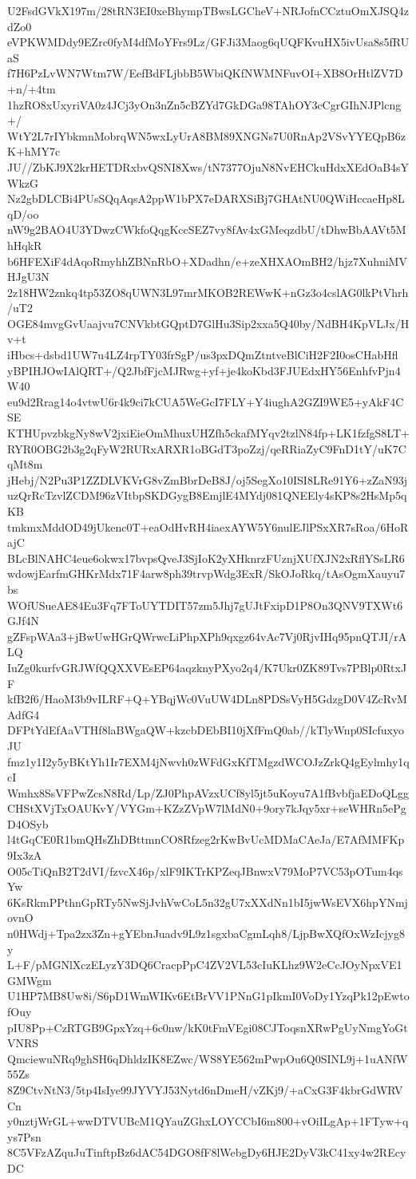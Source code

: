 U2FsdGVkX197m/28tRN3EI0xeBhympTBwsLGCheV+NRJofnCCztuOmXJSQ4zdZo0
eVPKWMDdy9EZrc0fyM4dfMoYFrs9Lz/GFJi3Maog6qUQFKvuHX5ivUsa8s5fRUaS
f7H6PzLvWN7Wtm7W/EefBdFLjbbB5WbiQKfNWMNFuvOI+XB8OrHtlZV7D+n/+4tm
1hzRO8xUxyriVA0z4JCj3yOn3nZn5cBZYd7GkDGa98TAhOY3cCgrGIhNJPlcng+/
WtY2L7rIYbkmnMobrqWN5wxLyUrA8BM89XNGNs7U0RnAp2VSvYYEQpB6zK+hMY7c
JU//ZbKJ9X2krHETDRxbvQSNI8Xws/tN7377OjuN8NvEHCkuHdxXEdOaB4sYWkzG
Nz2gbDLCBi4PUsSQqAqsA2ppW1bPX7eDARXSiBj7GHAtNU0QWiHccaeHp8LqD/oo
nW9g2BAO4U3YDwzCWkfoQqgKccSEZ7vy8fAv4xGMeqzdbU/tDhwBbAAVt5MhHqkR
b6HFEXiF4dAqoRmyhhZBNnRbO+XDadhn/e+zeXHXAOmBH2/hjz7XuhniMVHJgU3N
2z18HW2znkq4tp53ZO8qUWN3L97mrMKOB2REWwK+nGz3o4cslAG0lkPtVhrh/uT2
OGE84mvgGvUaajvu7CNVkbtGQptD7GlHu3Sip2xxa5Q40by/NdBH4KpVLJx/Hv+t
iHbcs+dsbd1UW7u4LZ4rpTY03frSgP/us3pxDQmZtntveBlCiH2F2I0osCHabHfl
yBPIHJOwIAlQRT+/Q2JbfFjcMJRwg+yf+je4koKbd3FJUEdxHY56EnhfvPjn4W40
eu9d2Rrag14o4vtwU6r4k9ci7kCUA5WeGcI7FLY+Y4iughA2GZI9WE5+yAkF4CSE
KTHUpvzbkgNy8wV2jxiEieOmMhuxUHZfh5ckafMYqv2tzlN84fp+LK1fzfgS8LT+
RYR0OBG2b3g2qFyW2RURxARXR1oBGdT3poZzj/qeRRiaZyC9FnD1tY/uK7CqMt8m
jHebj/N2Pu3P1ZZDLVKVrG8vZmBbrDeB8J/oj5SegXo10ISI8LRe91Y6+zZaN93j
uzQrRcTzvlZCDM96zVItbpSKDGygB8EmjlE4MYdj081QNEEly4sKP8s2HsMp5qKB
tmkmxMddOD49jUkenc0T+eaOdHvRH4iaexAYW5Y6nulEJlPSxXR7sRoa/6HoRajC
BLcBlNAHC4eue6okwx17bvpsQveJ3SjIoK2yXHknrzFUznjXUfXJN2xRflYSsLR6
wdowjEarfmGHKrMdx71F4arw8ph39trvpWdg3ExR/SkOJoRkq/tAsOgmXauyu7bs
WOfUSueAE84Eu3Fq7FToUYTDIT57zm5Jhj7gUJtFxipD1P8On3QNV9TXWt6GJf4N
gZFspWAa3+jBwUwHGrQWrwcLiPhpXPh9qxgz64vAc7Vj0RjvIHq95pnQTJI/rALQ
IuZg0kurfvGRJWfQQXXVEsEP64aqzknyPXyo2q4/K7Ukr0ZK89Tvs7PBlp0RtxJF
kfB2f6/HaoM3b9vILRF+Q+YBqjWc0VuUW4DLn8PDSsVyH5GdzgD0V4ZcRvMAdfG4
DFPtYdEfAaVTHf8laBWgaQW+kzcbDEbBI10jXfFmQ0ab//kTlyWnp0SIcfuxyoJU
fmz1y1I2y5yBKtYh1Ir7EXM4jNwvh0zWFdGxKfTMgzdWCOJzZrkQ4gEylmhy1qcI
Wmhx8SsVFPwZcsN8Rd/Lp/ZJ0PhpAVzxUCf8yl5jt5uKoyu7A1fBvbfjaEDoQLgg
CHStXVjTxOAUKvY/VYGm+KZzZVpW7lMdN0+9ory7kJqy5xr+seWHRn5ePgD4OSyb
l4tGqCE0R1bmQHsZhDBttmnCO8Rfzeg2rKwBvUcMDMaCAeJa/E7AfMMFKp9Ix3zA
O05cTiQnB2T2dVI/fzvcX46p/xlF9IKTrKPZeqJBnwxV79MoP7VC53pOTum4qsYw
6KsRkmPPthnGpRTy5NwSjJvhVwCoL5n32gU7xXXdNn1bI5jwWsEVX6hpYNmjovnO
n0HWdj+Tpa2zx3Zn+gYEbnJuadv9L9z1sgxbaCgmLqh8/LjpBwXQfOxWzIcjyg8y
L+F/pMGNlXczELyzY3DQ6CracpPpC4ZV2VL53cIuKLhz9W2eCcJOyNpxVE1GMWgm
U1HP7MB8Uw8i/S6pD1WmWIKv6EtBrVV1PNnG1pIkmI0VoDy1YzqPk12pEwtofOuy
pIU8Pp+CzRTGB9GpxYzq+6c0nw/kK0tFmVEgi08CJToqsnXRwPgUyNmgYoGtVNRS
QmciewuNRq9ghSH6qDhldzIK8EZwc/WS8YE562mPwpOu6Q0SINL9j+1uANfW55Zs
8Z9CtvNtN3/5tp4IsIye99JYVYJ53Nytd6nDmeH/vZKj9/+aCxG3F4kbrGdWRVCn
y0nztjWrGL+wwDTVUBcM1QYauZGhxLOYCCbI6m800+vOiILgAp+1FTyw+qys7Psn
8C5VFzAZquJuTinftpBz6dAC54DGO8fF8lWebgDy6HJE2DyV3kC41xy4w2REcyDC
